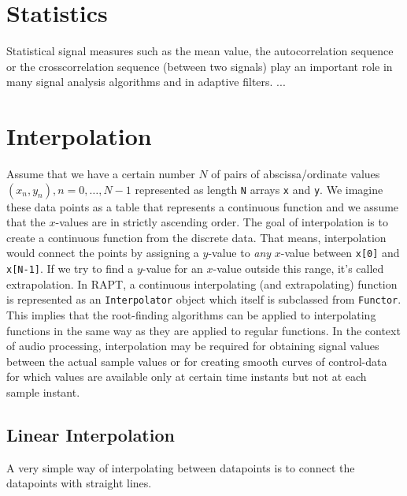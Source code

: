 \section{Statistics}
Statistical signal measures such as the mean value, the autocorrelation sequence or the crosscorrelation sequence (between two signals) play an important role in many signal analysis algorithms and in adaptive filters. ...

\section{Interpolation}
Assume that we have a certain number $N$ of pairs of abscissa/ordinate values $(x_n, y_n), n = 0, \ldots, N-1$ represented as length \texttt{N} arrays \texttt{x} and \texttt{y}. We imagine these data points as a table that represents a continuous function and we assume that the $x$-values are in strictly ascending order. The goal of interpolation is to create a continuous function from the discrete data. That means, interpolation would connect the points by assigning a $y$-value to \emph{any} $x$-value between \texttt{x[0]} and \texttt{x[N-1]}. If we try to find a $y$-value for an $x$-value outside this range, it's called extrapolation. In RAPT, a continuous interpolating (and extrapolating) function is represented as an \texttt{Interpolator} object which itself is subclassed from \texttt{Functor}. This implies that the root-finding algorithms can be applied to interpolating functions in the same way as they are applied to regular functions. In the context of audio processing, interpolation may be required for obtaining signal values between the actual sample values or for creating smooth curves of control-data for which values are available only at certain time instants but not at each sample instant.

\subsection{Linear Interpolation}
A very simple way of interpolating between datapoints is to connect the datapoints with straight lines. 

